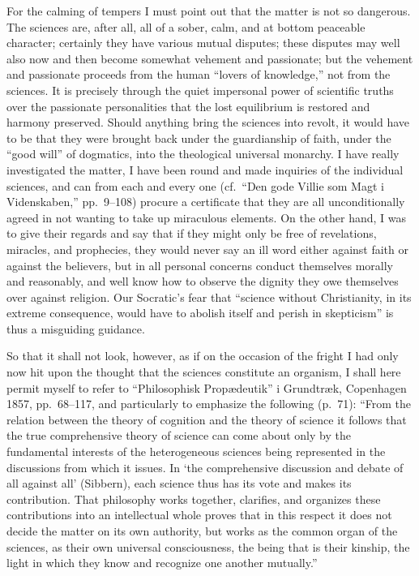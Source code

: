 \documentclass[12pt]{book}
\newcommand{\opage}[1]{\marginnote{\footnotesize\textit{[#1]}}}
\begin{document}
For the calming of tempers I must point out that the matter is not so
dangerous. The sciences are, after all, all of a sober, calm, and at
bottom peaceable character; certainly they have various mutual disputes;
these disputes may well also now and then become somewhat vehement and
passionate; but the vehement and passionate proceeds from the human
``lovers of knowledge,'' not from the sciences. It is precisely through
the quiet impersonal power of scientific truths over the passionate
personalities that the lost equilibrium is restored and harmony preserved.
Should anything bring the sciences into revolt, it would have to be that
they were brought back under the guardianship of faith, under
\opage{318}\setcounter{footnote}{0}%
the ``good will'' of dogmatics, into the theological universal monarchy. I
have really investigated the matter, I have been round and made inquiries
of the individual sciences, and can from each and every one (cf.\ ``Den
gode Villie som Magt i Videnskaben,'' pp.~9--108) procure a certificate
that they are all unconditionally agreed in not wanting to take up
miraculous elements. On the other hand, I was to give their regards and
say that if they might only be free of revelations, miracles, and
prophecies, they would never say an ill word either against faith or
against the believers, but in all personal concerns conduct themselves
morally and reasonably, and well know how to observe the dignity they owe
themselves over against religion. Our Socratic's fear that ``science
without Christianity, in its extreme consequence, would have to abolish
itself and perish in skepticism'' is thus a misguiding guidance.

So that it shall not look, however, as if on the occasion of the fright I
had only now hit upon the thought that the sciences constitute an
organism, I shall here permit myself to refer to ``Philosophisk
Propædeutik'' i Grundtræk, Copenhagen 1857, pp.~68--117, and
particularly to emphasize the following (p.~71): ``From the relation
between the theory of cognition and the theory of science it follows that
the true comprehensive theory of science can come about only by the
fundamental interests of the heterogeneous sciences being represented in
the discussions from which it issues. In `the comprehensive discussion and
debate of all against all' (Sibbern), each science thus has its vote and
makes its contribution. That philosophy works together, clarifies, and
organizes these contributions into an intellectual whole proves that in
this respect it does not decide the matter on its own authority, but
works as the common organ of the sciences, as their own universal
consciousness, the being that is their kinship, the light in which they
know and recognize one another mutually.''
\end{document}
